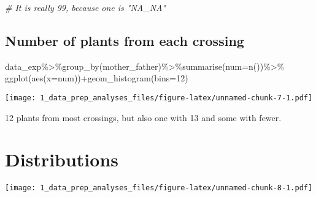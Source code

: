 \documentclass[
]{article}
\newenvironment{Shaded}{\begin{snugshade}}{\end{snugshade}}
\newcommand{\AttributeTok}[1]{\textcolor[rgb]{0.77,0.63,0.00}{#1}}
\newcommand{\CommentTok}[1]{\textcolor[rgb]{0.56,0.35,0.01}{\textit{#1}}}
\newcommand{\DecValTok}[1]{\textcolor[rgb]{0.00,0.00,0.81}{#1}}
\newcommand{\FunctionTok}[1]{\textcolor[rgb]{0.00,0.00,0.00}{#1}}
\newcommand{\NormalTok}[1]{#1}
\newcommand{\SpecialCharTok}[1]{\textcolor[rgb]{0.00,0.00,0.00}{#1}}
\begin{document}
\begin{Shaded}
\begin{Highlighting}[]
\CommentTok{\# It is really 99, because one is "NA\_NA"}
\end{Highlighting}
\end{Shaded}

\hypertarget{number-of-plants-from-each-crossing}{%
\subsection{Number of plants from each
crossing}\label{number-of-plants-from-each-crossing}}

\begin{Shaded}
\begin{Highlighting}[]
\NormalTok{data\_exp}\SpecialCharTok{\%\textgreater{}\%}\FunctionTok{group\_by}\NormalTok{(mother\_father)}\SpecialCharTok{\%\textgreater{}\%}\FunctionTok{summarise}\NormalTok{(}\AttributeTok{num=}\FunctionTok{n}\NormalTok{())}\SpecialCharTok{\%\textgreater{}\%}
  \FunctionTok{ggplot}\NormalTok{(}\FunctionTok{aes}\NormalTok{(}\AttributeTok{x=}\NormalTok{num))}\SpecialCharTok{+}\FunctionTok{geom\_histogram}\NormalTok{(}\AttributeTok{bins=}\DecValTok{12}\NormalTok{)}
\end{Highlighting}
\end{Shaded}

\texttt{[image: 1\_data\_prep\_analyses\_files/figure-latex/unnamed-chunk-7-1.pdf]}

12 plants from most crossings, but also one with 13 and some with fewer.

\hypertarget{distributions}{%
\section{Distributions}\label{distributions}}

\begin{Shaded}
\end{Shaded}

\texttt{[image: 1\_data\_prep\_analyses\_files/figure-latex/unnamed-chunk-8-1.pdf]}

\begin{Shaded}
\end{Shaded}
\end{document}
